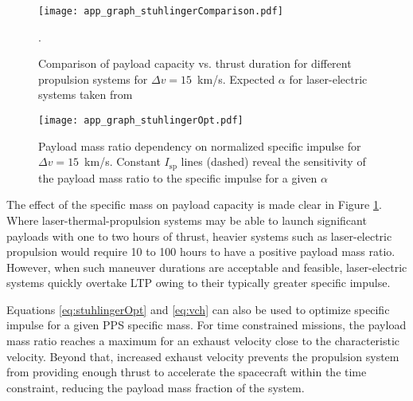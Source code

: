 \documentclass[final,3p,times,twocolumn,sort&compress, lefttitle]{elsarticle}
\begin{document}
            \begin{figure}[t]
                \centering
                \texttt{[image: app\_graph\_stuhlingerComparison.pdf]}
                \caption{Comparison of payload capacity vs. thrust duration for different propulsion systems for $\Delta v=15$~km/s. Expected $\alpha$ for laser-electric systems taken from \cite{sheerin_fast_2021}}.
                \label{fig:app_stuhlComp}
            \end{figure}
            
            \begin{figure}[h]
                \centering
                \texttt{[image: app\_graph\_stuhlingerOpt.pdf]}
                \caption{Payload mass ratio dependency on normalized specific impulse for $\Delta v=15$~km/s. Constant $I_\mathrm{sp}$ lines (dashed) reveal the sensitivity of the payload mass ratio to the specific impulse for a given $\alpha$}
                \label{fig:app_stuhlOpt}
            \end{figure}
            
            The effect of the specific mass on payload capacity is made clear in Figure \ref{fig:app_stuhlComp}. Where laser-thermal-propulsion systems may be able to launch significant payloads with one to two hours of thrust, heavier systems such as laser-electric propulsion would require 10 to 100 hours to have a positive payload mass ratio. However, when such maneuver durations are acceptable and feasible, laser-electric systems quickly overtake LTP owing to their typically greater specific impulse.
            
            Equations \ref{eq:stuhlingerOpt} and \ref{eq:vch} can also be used to optimize specific impulse for a given PPS specific mass. For time constrained missions, the payload mass ratio reaches a maximum for an exhaust velocity close to the characteristic velocity. Beyond that, increased exhaust velocity prevents the propulsion system from providing enough thrust to accelerate the spacecraft within the time constraint, reducing the payload mass fraction of the system.
            
\end{document}
